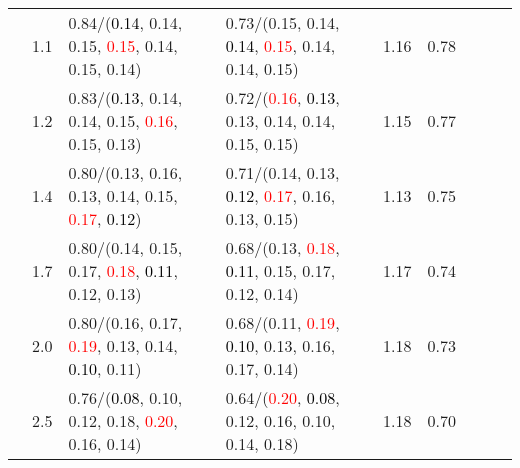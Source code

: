 \documentclass[10pt,a4paper]{report}
\begin{document}
\begin{table}[!htbp]
\begin{center}
{\begin{tabular}{ccllccccc}
				  & 1.1                               & 0.84/(\textcolor{black}{0.14}, 0.14, 0.15, \textcolor{red}{0.15}, 0.14, 0.15, 0.14)                                                                                                           & 0.73/(0.15, 0.14, \textcolor{black}{0.14}, \textcolor{red}{0.15}, 0.14, 0.14, 0.15)                                                                                                           & 1.16             & 0.78                     \\
				  & 1.2                               & 0.83/(\textcolor{black}{0.13}, 0.14, 0.14, 0.15, \textcolor{red}{0.16}, 0.15, 0.13)                                                                                                           & 0.72/(\textcolor{red}{0.16}, \textcolor{black}{0.13}, 0.13, 0.14, 0.14, 0.15, 0.15)                                                                                                           & 1.15             & 0.77                     \\
				  & 1.4                               & 0.80/(0.13, 0.16, 0.13, 0.14, 0.15, \textcolor{red}{0.17}, \textcolor{black}{0.12})                                                                                                           & 0.71/(0.14, 0.13, \textcolor{black}{0.12}, \textcolor{red}{0.17}, 0.16, 0.13, 0.15)                                                                                                           & 1.13             & 0.75                     \\
				  & 1.7                               & 0.80/(0.14, 0.15, 0.17, \textcolor{red}{0.18}, \textcolor{black}{0.11}, 0.12, 0.13)                                                                                                           & 0.68/(0.13, \textcolor{red}{0.18}, \textcolor{black}{0.11}, 0.15, 0.17, 0.12, 0.14)                                                                                                           & 1.17             & 0.74                     \\
				  & 2.0                               & 0.80/(0.16, 0.17, \textcolor{red}{0.19}, 0.13, 0.14, \textcolor{black}{0.10}, 0.11)                                                                                                           & 0.68/(0.11, \textcolor{red}{0.19}, \textcolor{black}{0.10}, 0.13, 0.16, 0.17, 0.14)                                                                                                           & 1.18             & 0.73                     \\
				  & 2.5                               & 0.76/(\textcolor{black}{0.08}, 0.10, 0.12, 0.18, \textcolor{red}{0.20}, 0.16, 0.14)                                                                                                           & 0.64/(\textcolor{red}{0.20}, \textcolor{black}{0.08}, 0.12, 0.16, 0.10, 0.14, 0.18)                                                                                                           & 1.18             & 0.70                     \\

\end{tabular}}
\end{center}
\end{table}
\end{document}
